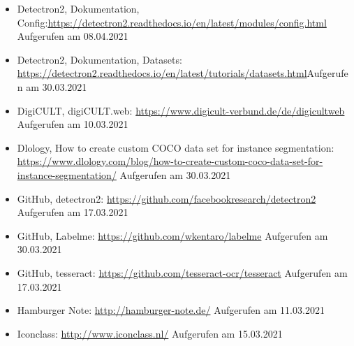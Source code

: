 \documentclass[a4paper,12pt,ngerman]{article}
\begin{document}
\begin{itemize}
\item Detectron2, Dokumentation, Config:\newline \href{https://detectron2.readthedocs.io/en/latest/modules/config.html}{https://detectron2.readthedocs.io/en/latest/modules/config.html} \newline Aufgerufen am 08.04.2021
\item Detectron2, Dokumentation, Datasets: \newline \href{https://detectron2.readthedocs.io/en/latest/tutorials/datasets.html}{https://detectron2.readthedocs.io/en/latest/tutorials/datasets.html}\newline Aufgerufen am 30.03.2021
\item DigiCULT, digiCULT.web: \newline \href{https://www.digicult-verbund.de/de/digicultweb}{https://www.digicult-verbund.de/de/digicultweb} \newline Aufgerufen am 10.03.2021
\item Dlology, How to create custom COCO data set for instance segmentation: \newline \href{https://www.dlology.com/blog/how-to-create-custom-coco-data-set-for-instance-segmentation/}{https://www.dlology.com/blog/how-to-create-custom-coco-data-set-for-instance-segmentation/} \newline Aufgerufen am 30.03.2021
\item GitHub, detectron2: \newline \href{https://github.com/facebookresearch/detectron2}{https://github.com/facebookresearch/detectron2} \newline Aufgerufen am 17.03.2021
\item GitHub, Labelme: \newline \href{https://github.com/wkentaro/labelme}{https://github.com/wkentaro/labelme} \newline Aufgerufen am 30.03.2021
\item GitHub, tesseract: \newline \href{https://github.com/tesseract-ocr/tesseract}{https://github.com/tesseract-ocr/tesseract} \newline Aufgerufen am 17.03.2021
\item Hamburger Note: \newline \href{http://hamburger-note.de/}{http://hamburger-note.de/} \newline Aufgerufen am 11.03.2021
\item Iconclass: \newline \href{http://www.iconclass.nl/}{http://www.iconclass.nl/} \newline Aufgerufen am 15.03.2021

\end{itemize}
\end{document}
